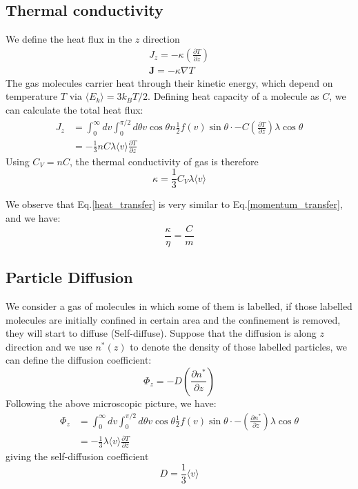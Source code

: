 \documentclass{article}
\begin{document}
\subsection{Thermal conductivity}
We define the heat flux in the $z$ direction
\begin{gather}
    J_z = -\kappa \left( \frac{\partial T}{\partial z} \right) \\
    \mathbf{J} = -\kappa \nabla T
\end{gather}
The gas molecules carrier heat through their kinetic energy, which depend on temperature $T$ via $\langle E_k \rangle = 3k_BT / 2$. Defining heat capacity of a 
molecule as $C$, we can calculate the total heat flux:
\begin{align}
    J_z &= \int_0^{\infty} dv \int_0^{\pi/2} d\theta 
    v \cos \theta n \frac{1}{2} f(v) \sin\theta \cdot - C \left( \frac{\partial T}{\partial z} \right) \lambda \cos\theta \\
    &= -\frac{1}{3} n C \lambda \langle v \rangle \frac{\partial T}{\partial z} \label{heat_transfer}
\end{align}
Using $C_V = n C$, the thermal conductivity of gas is therefore
\begin{equation}
    \kappa = \frac{1}{3} C_V \lambda \langle v \rangle
\end{equation}

We observe that Eq.\ref{heat_transfer} is very similar to Eq.\ref{momentum_transfer}, and we have:
\begin{equation}
    \frac{\kappa}{\eta} = \frac{C}{m}
\end{equation} 

\subsection{Particle Diffusion}
We consider a gas of molecules in which some of them is labelled, if those labelled molecules are initially confined in 
certain area and the confinement is removed, they will start to diffuse (Self-diffuse). Suppose that the diffusion is 
along $z$ direction and we use $n^*(z)$ to denote the density of those labelled particles, we can define the 
diffusion coefficient: 
\begin{equation}
    \Phi_z = -D \left( \frac{\partial n^*}{\partial z} \right)
\end{equation}
Following the above microscopic picture, we have:
\begin{align}
    \Phi_z &= \int_0^{\infty} dv \int_0^{\pi/2} d\theta 
    v \cos \theta \frac{1}{2} f(v) \sin\theta \cdot - \left( \frac{\partial n^*}{\partial z} \right) \lambda \cos\theta \\
    &= -\frac{1}{3} \lambda \langle v \rangle \frac{\partial T}{\partial z} 
\end{align}
giving the self-diffusion coefficient
\begin{equation}
    D = \frac{1}{3} \langle v \rangle
\end{equation}
\end{document}
